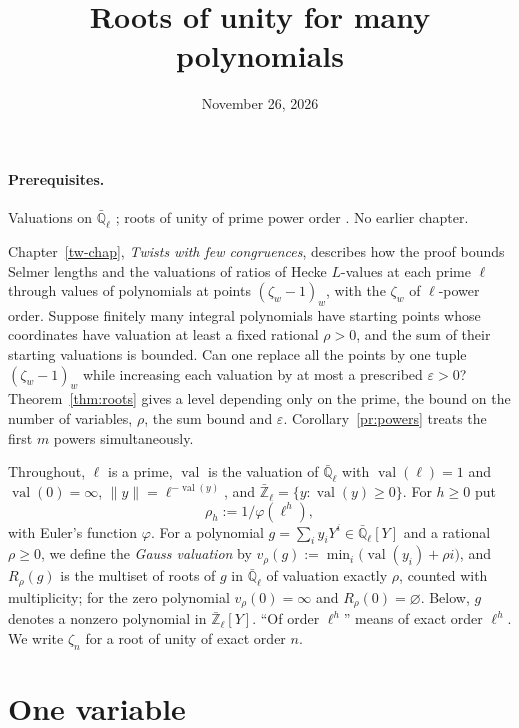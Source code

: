 \documentclass[reqno]{amsart}
\title{Roots of unity for many polynomials}
\author{}
\date{November 26, 2026}
\newcounter{chap}
\theoremstyle{definition}
\theoremstyle{plain}
\newcommand{\Ql}{\bar{\mathbb{Q}}_\ell}
\newcommand{\Zl}{\bar{\mathbb{Z}}_\ell}
\newcommand{\val}{\operatorname{val}}
\begin{document}
\maketitle
{}\label{chap}

\paragraph{Prerequisites.}
Valuations on \(\Ql\) \cite[Ch.~II]{Ne}; roots of unity of prime power order \cite[Ch.~1--2]{Wa}.  No earlier chapter.

\medskip
Chapter~\ref{tw-chap}, \emph{Twists with few congruences}, describes how the proof bounds Selmer lengths and the valuations of ratios of Hecke \(L\)-values at each prime \(\ell\) through values of polynomials at points \((\zeta_w - 1)_w\), with the \(\zeta_w\) of \(\ell\)-power order.  Suppose finitely many integral polynomials have starting points whose coordinates have valuation at least a fixed rational \(\rho > 0\), and the sum of their starting valuations is bounded.  Can one replace all the points by one tuple \((\zeta_w - 1)_w\) while increasing each valuation by at most a prescribed \(\varepsilon > 0\)?  Theorem~\ref{thm:roots} gives a level depending only on the prime, the bound on the number of variables, \(\rho\), the sum bound and \(\varepsilon\).  Corollary~\ref{pr:powers} treats the first \(m\) powers simultaneously.

Throughout, \(\ell\) is a prime, \(\val\) is the valuation of \(\Ql\) with \(\val(\ell) = 1\) and \(\val(0) = \infty\), \(\lVert y\rVert = \ell^{-\val(y)}\), and \(\Zl = \{y : \val(y) \ge 0\}\).  For \(h \ge 0\) put
\[
  \rho_h := 1/\varphi(\ell^h),
\]
with Euler's function \(\varphi\).  For a polynomial \(g = \sum_i y_i Y^i \in \Ql[Y]\) and a rational \(\rho \ge 0\), we define the \emph{Gauss valuation} by \(v_\rho(g) := \min_i \bigl(\val(y_i) + \rho i\bigr)\), and \(R_\rho(g)\) is the multiset of roots of \(g\) in \(\Ql\) of valuation exactly \(\rho\), counted with multiplicity; for the zero polynomial \(v_\rho(0) = \infty\) and \(R_\rho(0) = \varnothing\).  Below, \(g\) denotes a nonzero polynomial in \(\Zl[Y]\).  ``Of order \(\ell^h\)'' means of exact order \(\ell^h\).  We write \(\zeta_n\) for a root of unity of exact order \(n\).

\section{One variable}\label{sec:one}
\end{document}
